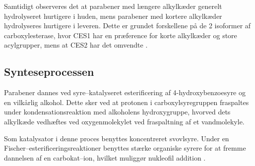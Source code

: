     Samtidigt observeres det at parabener med længere alkylkæder generelt hydrolyseret hurtigere i huden, mens parabener med kortere alkylkæder hydrolyseres hurtigere i leveren. Dette er grundet forskellene på de 2 isoformer af carboxylesterase, hvor CES1 har en præference for korte alkylkæder og store acylgrupper, mens at CES2 har det omvendte \parencite{Cath2021}.

    \subsection{Synteseprocessen}
    Parabener dannes ved syre--katalyseret esterificering af 4-hydroxybenzoesyre og en vilkårlig alkohol. Dette sker ved at protonen i carboxylsyregruppen fraspaltes under kondensationsreaktion med alkoholens hydroxygruppe, hvorved dets alkylkæde vedhæftes ved oxygenmolekylet ved fraspaltning af et vandmolekyle.

    Som katalysator i denne proces benyttes koncentreret svovlsyre. Under en Fischer--esterificeringsreaktioner benyttes stærke organiske syrere for at fremme dannelsen af en carbokat--ion, hvilket muliggør nukleofil addition \parencite{Stev2023}. 

